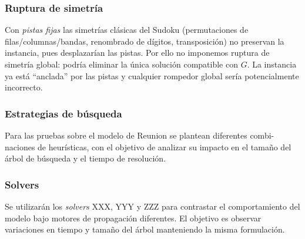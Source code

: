 \subsubsection*{Ruptura de simetría}
Con \emph{pistas fijas} las simetrías clásicas del Sudoku (permutaciones de filas/columnas/bandas, renombrado de dígitos, transposición) no preservan la instancia, pues desplazarían las pistas. Por ello no imponemos ruptura de simetría global: podría eliminar la única solución compatible con \(G\). La instancia ya está “anclada” por las pistas y cualquier rompedor global sería potencialmente incorrecto.

\subsubsection*{Estrategias de búsqueda}
Para las pruebas sobre el modelo de Reunion se plantean diferentes combi-
naciones de heurísticas, con el objetivo de analizar su impacto en el tamaño
del árbol de búsqueda y el tiempo de resolución.

\subsubsection*{Solvers}
Se utilizarán los \emph{solvers} XXX, YYY y ZZZ para contrastar el comportamiento del modelo bajo motores de propagación diferentes. El objetivo es observar variaciones en tiempo y tamaño del árbol manteniendo la misma formulación.

